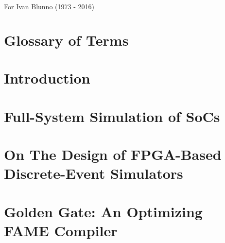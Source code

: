 \documentclass[phd]{ucbthesis}
\begin{document}
\begin{frontmatter}

\chapter*{}
    \begin{center}
    For Ivan Blunno (1973 - 2016)
    \end{center}
\clearpage

\setcounter{tocdepth}{2}
\setcounter{secnumdepth}{2}
\tableofcontents
\clearpage
\listoffigures
\clearpage
\listoftables
\clearpage
\chapter*{Glossary of Terms}
    

\begin{acknowledgements}

\end{acknowledgements}
\end{frontmatter}

\pagestyle{headings}


\chapter{Introduction}



\chapter{Full-System Simulation of SoCs}\label{sec:simulation-background}



\chapter{On The Design of FPGA-Based Discrete-Event Simulators}\label{ch:fpga-des}

\label{sec:fpga-des}

\chapter{Golden Gate: An Optimizing FAME Compiler}\label{sec:golden-gate}
\end{document}
